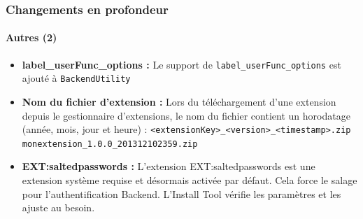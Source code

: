 \begin{frame}[fragile]
	\frametitle{Changements en profondeur}
	\framesubtitle{Autres (2)}

	\begin{itemize}

		\item \textbf{label\_userFunc\_options :}\newline
			\small
				Le support de \texttt{label\_userFunc\_options} est ajouté à \texttt{BackendUtility}
			\normalsize

		\item \textbf{Nom du fichier d'extension :}\newline
			\small
				Lors du téléchargement d'une extension depuis le gestionnaire d'extensions, le nom du fichier contient un horodatage (année, mois, jour et heure) :\newline
				\texttt{<extensionKey>\_<version>\_<timestamp>.zip}\newline
				\texttt{monextension\_1.0.0\_201312102359.zip}
			\normalsize

		\item \textbf{EXT:saltedpasswords :}\newline
			\small
				L'extension EXT:saltedpasswords est une extension système requise et désormais activée par défaut.
				Cela force le salage pour l'authentification Backend. L'Install Tool vérifie les paramètres et les ajuste au besoin.
			\normalsize

	\end{itemize}
	
\end{frame}


